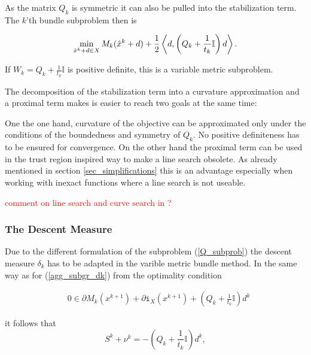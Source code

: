 As the matrix \(Q_k\) is symmetric it can also be pulled into the stabilization term. The \(k\)'th bundle subproblem then is

\begin{equation}
	\min_{\hat{x}^k+d \in X} M_k(\hat{x}^k+d) + \frac{1}{2}\left\langle d,\left(Q_k+\frac{1}{t_k}\mathbb{I} \right) d \right\rangle.
	\label{Q_subprob}
\end{equation}

If \(W_k = Q_k+\frac{1}{t_k}\mathbb{I}\) is positive definite, this is a variable metric subproblem.

The decomposition of the stabilization term into a curvature approximation and a proximal term makes is easier to reach two goals at the same time:

One the one hand, curvature of the objective can be approximated only under the conditions of the boundedness and symmetry of \(Q_k\). No positive definiteness has to be ensured for convergence.
On the other hand the proximal term can be used in the trust region inspired way to make a line search obsolete. As already mentioned in section \ref{sec_simplifications} this is an advantage especially when working with inexact functions where a line search is not useable.

\textcolor{red}{comment on line search and curve search in \cite{Lemarechal1994,Lemarechal1997,Vlcek2001}?}

\subsubsection{The Descent Measure}

Due to the different formulation of the subproblem (\ref{Q_subprob}) the descent measure \(\delta_k\) has to be adapted in the varible metric bundle method.
In the same way as for (\ref{agg_subgr_dk}) from the optimality condition

\begin{align*}
	& 0 \in \partial M_k(x^{k+1})+\partial\mathtt{i}_{X}(x^{k+1})+\left(Q_k+\frac{1}{t_k}\mathbb{I}\right)d^k
	\label{Noll_opt_cond}
\end{align*}

it follows that 
\begin{equation}
	S^k+\nu^k = -\left(Q_k+\frac{1}{t_k}\mathbb{I}\right)d^k,
	\label{subgr_Q}
\end{equation}

